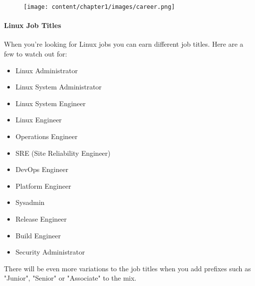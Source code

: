 \begin{flushleft}

\begin{figure}[h!]
	\centering
	\texttt{[image: content/chapter1/images/career.png]}
\end{figure}

\newpage
\paragraph{Linux Job Titles}
\bigskip
\bigskip
When you're looking for Linux jobs you can earn different job titles. Here are a few to watch out for:
\begin{itemize}
	\item Linux Administrator
	\item Linux System Administrator
	\item Linux System Engineer
	\item Linux Engineer
	\item Operations Engineer
	\item SRE (Site Reliability Engineer)
	\item DevOps Engineer
	\item Platform Engineer
	\item Sysadmin
	\item Release Engineer
	\item Build Engineer
	\item Security Administrator
\end{itemize}

There will be even more variations to the job titles when you add prefixes such as "Junior", "Senior" or "Associate" to the mix.

\end{flushleft}


\newpage
